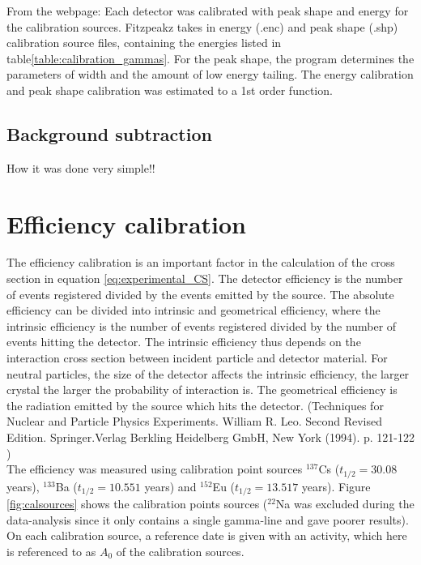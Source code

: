 From the webpage:
Each detector was calibrated with peak shape and energy for the calibration sources. Fitzpeakz takes in energy (.enc) and peak shape (.shp) calibration source files, containing the energies listed in table\ref{table:calibration_gammas}. For the peak shape, the program determines the parameters of width and the amount of low energy tailing. The energy calibration and peak shape calibration was estimated to a 1st order function. 

\subsection{Background subtraction}

How it was done very simple!!

\section{Efficiency calibration} \label{sec:efficiency_calibration}
The efficiency calibration is an important factor in the calculation of the cross section in equation \ref{eq:experimental_CS}. The detector efficiency is the number of events registered divided by the events emitted by the source. The absolute efficiency can be divided into intrinsic and geometrical efficiency, where the intrinsic efficiency is the number of events registered divided by the number of events hitting the detector. The
intrinsic efficiency thus depends on the interaction cross section between incident particle and detector material. For neutral particles, the size of the detector affects the intrinsic efficiency, the larger crystal the larger the probability of interaction is. The geometrical efficiency is the radiation emitted by the source which hits the detector. (Techniques for Nuclear and Particle Physics Experiments. William R. Leo. Second Revised Edition. Springer.Verlag Berkling Heidelberg GmbH, New York (1994). p. 121-122 ) \\

\noindent 
The efficiency was measured using calibration point sources $^{137}$Cs ($t_{1/2}=30.08$ years\cite{Browne2007}), $^{133}$Ba ($t_{1/2}=10.551$ years\cite{Khazov2011}) and $^{152}$Eu ($t_{1/2}=13.517$ years\cite{Martin2013}). Figure \ref{fig:calsources} shows the calibration points sources ($^{22}$Na was excluded during the data-analysis since it only contains a single gamma-line and gave poorer results). On each calibration source, a reference date is given with an activity, which here is referenced to as $A_0$ of the calibration sources.\\

